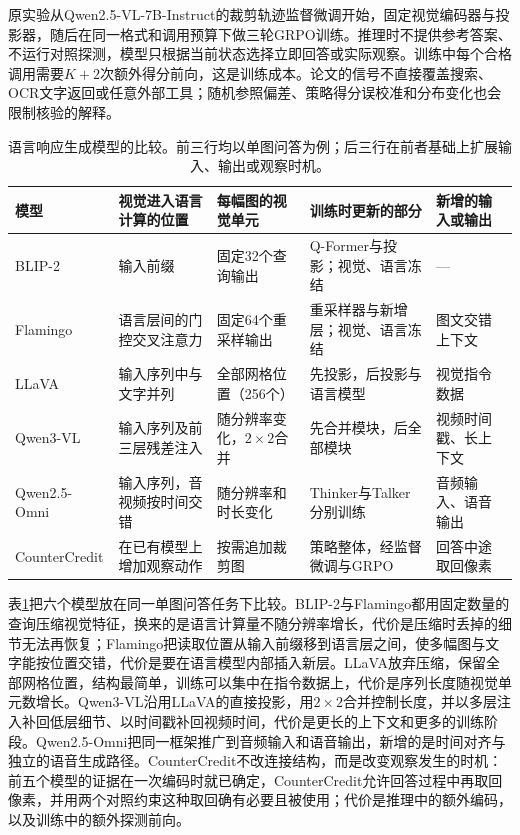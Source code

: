 原实验从Qwen2.5-VL-7B-Instruct的裁剪轨迹监督微调开始，固定视觉编码器与投影器，随后在同一格式和调用预算下做三轮GRPO训练。推理时不提供参考答案、不运行对照探测，模型只根据当前状态选择立即回答或实际观察。训练中每个合格调用需要$K+2$次额外得分前向，这是训练成本。论文的信号不直接覆盖搜索、OCR文字返回或任意外部工具；随机参照偏差、策略得分误校准和分布变化也会限制核验的解释。

\begin{table}[tbp]
  \centering
  \small
  \begin{tabularx}{\linewidth}{@{}p{22mm}p{30mm}p{30mm}XX@{}}
    \toprule
    模型 & 视觉进入语言计算的位置 & 每幅图的视觉单元 & 训练时更新的部分 & 新增的输入或输出\\
    \midrule
    BLIP-2 & 输入前缀 & 固定32个查询输出 & Q-Former与投影；视觉、语言冻结 & —\\
    Flamingo & 语言层间的门控交叉注意力 & 固定64个重采样输出 & 重采样器与新增层；视觉、语言冻结 & 图文交错上下文\\
    LLaVA & 输入序列中与文字并列 & 全部网格位置（256个） & 先投影，后投影与语言模型 & 视觉指令数据\\
    Qwen3-VL & 输入序列及前三层残差注入 & 随分辨率变化，$2\times2$合并 & 先合并模块，后全部模块 & 视频时间戳、长上下文\\
    Qwen2.5-Omni & 输入序列，音视频按时间交错 & 随分辨率和时长变化 & Thinker与Talker分别训练 & 音频输入、语音输出\\
    CounterCredit & 在已有模型上增加观察动作 & 按需追加裁剪图 & 策略整体，经监督微调与GRPO & 回答中途取回像素\\
    \bottomrule
  \end{tabularx}
  \caption{语言响应生成模型的比较。前三行均以单图问答为例；后三行在前者基础上扩展输入、输出或观察时机。}
  \label{tab:vision-models-language-compare}
\end{table}

表\ref{tab:vision-models-language-compare}把六个模型放在同一单图问答任务下比较。BLIP-2与Flamingo都用固定数量的查询压缩视觉特征，换来的是语言计算量不随分辨率增长，代价是压缩时丢掉的细节无法再恢复；Flamingo把读取位置从输入前缀移到语言层之间，使多幅图与文字能按位置交错，代价是要在语言模型内部插入新层。LLaVA放弃压缩，保留全部网格位置，结构最简单，训练可以集中在指令数据上，代价是序列长度随视觉单元数增长。Qwen3-VL沿用LLaVA的直接投影，用$2\times2$合并控制长度，并以多层注入补回低层细节、以时间戳补回视频时间，代价是更长的上下文和更多的训练阶段。Qwen2.5-Omni把同一框架推广到音频输入和语音输出，新增的是时间对齐与独立的语音生成路径。CounterCredit不改连接结构，而是改变观察发生的时机：前五个模型的证据在一次编码时就已确定，CounterCredit允许回答过程中再取回像素，并用两个对照约束这种取回确有必要且被使用；代价是推理中的额外编码，以及训练中的额外探测前向。


